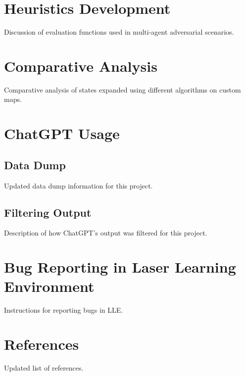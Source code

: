 \documentclass{article}
\begin{document}
\newpage
\section{Heuristics Development}
Discussion of evaluation functions used in multi-agent adversarial scenarios.

\newpage
\section{Comparative Analysis}
Comparative analysis of states expanded using different algorithms on custom maps.

\newpage
\section{ChatGPT Usage}
\subsection{Data Dump}
Updated data dump information for this project.

\subsection{Filtering Output}
Description of how ChatGPT's output was filtered for this project.

\newpage
\section{Bug Reporting in Laser Learning Environment}
Instructions for reporting bugs in LLE.

\newpage
\section{References}
Updated list of references.
\end{document}
